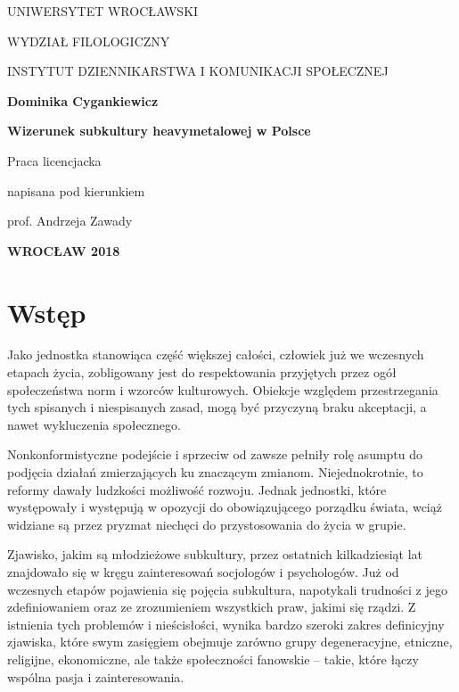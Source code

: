 \documentclass[12pt, a4paper, titlepage]{report}
\begin{document}
\begin{titlepage}
	\centering
	{UNIWERSYTET WROCŁAWSKI \par
	WYDZIAŁ FILOLOGICZNY\par
	INSTYTUT DZIENNIKARSTWA I KOMUNIKACJI SPOŁECZNEJ \par}
	\vspace{2cm}
	{\bfseries{\normalsize Dominika Cygankiewicz}\par}
	\vspace{2cm}
	{\bfseries {\Large Wizerunek subkultury heavymetalowej w Polsce}\par}
	\vspace{10cm}
	\vfill
	\begin{flushright}
	Praca licencjacka\par
	napisana pod kierunkiem\par
	prof. Andrzeja Zawady
	\end{flushright}

	\vfill

	{\large \textbf{WROCŁAW 2018}\par}
\end{titlepage}

\tableofcontents
\newpage

\chapter*{Wstęp}
Jako jednostka stanowiąca część większej całości, człowiek już we wczesnych etapach życia, zobligowany jest do respektowania przyjętych przez ogół społeczeństwa norm i wzorców kulturowych. Obiekcje względem przestrzegania tych spisanych i niespisanych zasad, mogą być przyczyną braku akceptacji, a nawet wykluczenia społecznego. 

Nonkonformistyczne podejście i sprzeciw od zawsze pełniły rolę asumptu do podjęcia działań zmierzających ku znaczącym zmianom. Niejednokrotnie, to reformy dawały ludzkości możliwość rozwoju. Jednak jednostki, które występowały i występują w opozycji do obowiązującego porządku świata, wciąż widziane są przez pryzmat niechęci do przystosowania do życia w grupie. 

Zjawisko, jakim są młodzieżowe subkultury, przez ostatnich kilkadziesiąt lat znajdowało się w kręgu zainteresowań socjologów i psychologów. Już od wczesnych etapów pojawienia się pojęcia subkultura, napotykali trudności z jego zdefiniowaniem oraz ze zrozumieniem wszystkich praw, jakimi się rządzi. Z istnienia tych problemów i nieścisłości, wynika bardzo szeroki zakres definicyjny zjawiska, które swym zasięgiem obejmuje zarówno grupy degeneracyjne, etniczne, religijne, ekonomiczne, ale także społeczności fanowskie -- takie, które łączy wspólna pasja i zainteresowania. 
\end{document}
